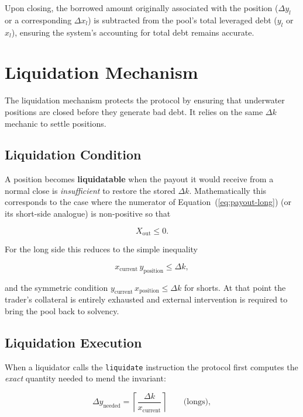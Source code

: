 \documentclass[11pt]{article}
\begin{document}
Upon closing, the borrowed amount originally associated with the position ($\Delta y_l$ or a corresponding $\Delta x_l$) is subtracted from the pool's total leveraged debt ($y_l$ or $x_l$), ensuring the system's accounting for total debt remains accurate.

\section{Liquidation Mechanism}

The liquidation mechanism protects the protocol by ensuring that underwater positions are closed before they generate bad debt. It relies on the same $\Delta k$ mechanic to settle positions.

\subsection{Liquidation Condition}

A position becomes \textbf{liquidatable} when the payout it would receive from a normal close is \emph{insufficient} to restore the stored $\Delta k$. Mathematically this corresponds to the case where the numerator of Equation~(\ref{eq:payout-long}) (or its short-side analogue) is non-positive so that

\begin{equation}
X_{\text{out}} \le 0 .
\end{equation}

For the long side this reduces to the simple inequality

\begin{equation}
x_{\text{current}}\,y_{\text{position}} \le \Delta k ,
\end{equation}

and the symmetric condition $y_{\text{current}}\,x_{\text{position}} \le \Delta k$ for shorts. At that point the trader's collateral is entirely exhausted and external intervention is required to bring the pool back to solvency.

\subsection{Liquidation Execution}

When a liquidator calls the \texttt{liquidate} instruction the protocol first computes the \emph{exact} quantity needed to mend the invariant:

\begin{equation}
\Delta y_{\text{needed}} = \left\lceil \frac{\Delta k}{x_{\text{current}}} \right\rceil \qquad\text{(longs)},
\end{equation}
\end{document}
